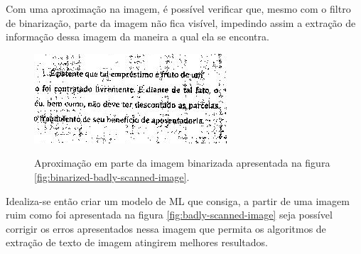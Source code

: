 Com uma aproximação na imagem, é possível verificar que, mesmo com o filtro de binarização, parte da imagem não fica visível, impedindo assim a extração de informação dessa imagem da maneira a qual ela se encontra.

\begin{figure}[H]
    \centering
    \caption{Aproximação em parte da imagem binarizada apresentada na figura \ref{fig:binarized-badly-scanned-image}.}
    \includegraphics[scale=1]{figuras/zoom-in-binarized-image.png}
    \label{fig:zoom-in-binarized-image}
\end{figure}

Idealiza-se então criar um modelo de ML que consiga, a partir de uma imagem ruim como foi apresentada na figura \ref{fig:badly-scanned-image} seja possível corrigir os erros apresentados nessa imagem que permita os algoritmos de extração de texto de imagem atingirem melhores resultados.